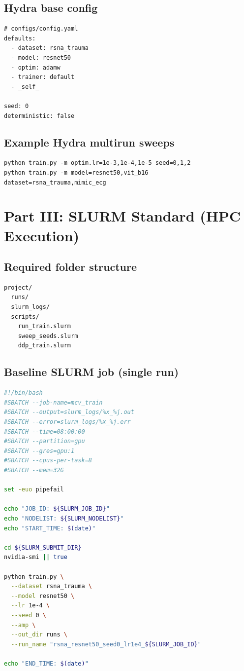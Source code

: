 \documentclass[11pt]{article}
\begin{document}
\subsection{Hydra base config}
\begin{lstlisting}
# configs/config.yaml
defaults:
  - dataset: rsna_trauma
  - model: resnet50
  - optim: adamw
  - trainer: default
  - _self_

seed: 0
deterministic: false
\end{lstlisting}

\subsection{Example Hydra multirun sweeps}
\begin{lstlisting}
python train.py -m optim.lr=1e-3,1e-4,1e-5 seed=0,1,2
python train.py -m model=resnet50,vit_b16 dataset=rsna_trauma,mimic_ecg
\end{lstlisting}

\section{Part III: SLURM Standard (HPC Execution)}
\subsection{Required folder structure}
\begin{lstlisting}
project/
  runs/
  slurm_logs/
  scripts/
    run_train.slurm
    sweep_seeds.slurm
    ddp_train.slurm
\end{lstlisting}

\subsection{Baseline SLURM job (single run)}
\begin{lstlisting}[language=bash]
#!/bin/bash
#SBATCH --job-name=mcv_train
#SBATCH --output=slurm_logs/%x_%j.out
#SBATCH --error=slurm_logs/%x_%j.err
#SBATCH --time=08:00:00
#SBATCH --partition=gpu
#SBATCH --gres=gpu:1
#SBATCH --cpus-per-task=8
#SBATCH --mem=32G

set -euo pipefail

echo "JOB_ID: ${SLURM_JOB_ID}"
echo "NODELIST: ${SLURM_NODELIST}"
echo "START_TIME: $(date)"

cd ${SLURM_SUBMIT_DIR}
nvidia-smi || true

python train.py \
  --dataset rsna_trauma \
  --model resnet50 \
  --lr 1e-4 \
  --seed 0 \
  --amp \
  --out_dir runs \
  --run_name "rsna_resnet50_seed0_lr1e4_${SLURM_JOB_ID}"

echo "END_TIME: $(date)"
\end{lstlisting}
\end{document}
